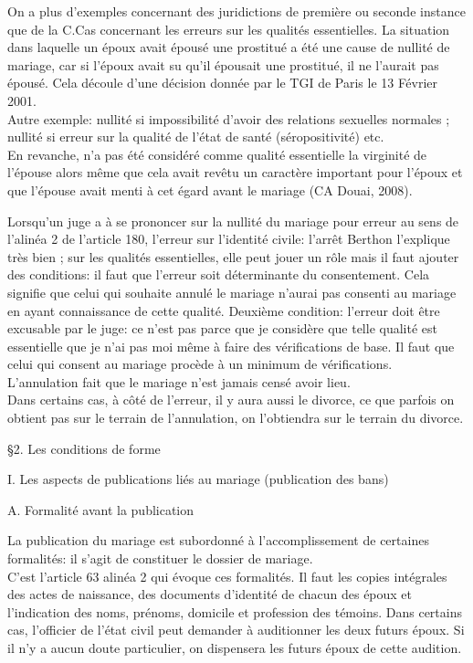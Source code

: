 \documentclass[12pt, a4paper, openany]{book}
\begin{document}
On a plus d'exemples concernant des juridictions de première ou seconde instance que de la C.Cas concernant les erreurs sur les qualités essentielles. La situation dans laquelle un époux avait épousé une prostitué a été une cause de nullité de mariage, car si l'époux avait su qu'il épousait une prostitué, il ne l'aurait pas épousé. Cela découle d'une décision donnée par le TGI de Paris le 13 Février 2001. \\
Autre exemple: nullité si impossibilité d'avoir des relations sexuelles normales ; nullité si erreur sur la qualité de l'état de santé (séropositivité) etc. \\
En revanche, n'a pas été considéré comme qualité essentielle la virginité de l'épouse alors même que cela avait revêtu un caractère important pour l'époux et que l'épouse avait menti à cet égard avant le mariage (CA Douai, 2008).


Lorsqu'un juge a à se prononcer sur la nullité du mariage pour erreur au sens de l'alinéa 2 de l'article 180, l'erreur sur l'identité civile: l'arrêt Berthon l'explique très bien ; sur les qualités essentielles, elle peut jouer un rôle mais il faut ajouter des conditions: il faut que l'erreur soit déterminante du consentement. Cela signifie que celui qui souhaite annulé le mariage n'aurai pas consenti au mariage en ayant connaissance de cette qualité. Deuxième condition: l'erreur doit être excusable par le juge: ce n'est pas parce que je considère que telle qualité est essentielle que je n'ai pas moi même à faire des vérifications de base. Il faut que celui qui consent au mariage procède à un minimum de vérifications. \\
L'annulation fait que le mariage n'est jamais censé avoir lieu. \\
Dans certains cas, à côté de l'erreur, il y aura aussi le divorce, ce que parfois on obtient pas sur le terrain de l'annulation, on l'obtiendra sur le terrain du divorce. 


§2. Les conditions de forme


I. Les aspects de publications liés au mariage (publication des bans)


A. Formalité avant la publication


La publication du mariage est subordonné à l'accomplissement de certaines formalités: il s'agit de constituer le dossier de mariage. \\
C'est l'article 63 alinéa 2 qui évoque ces formalités. Il faut les copies intégrales des actes de naissance, des documents d'identité de chacun des époux et l'indication des noms, prénoms, domicile et profession des témoins. Dans certains cas, l'officier de l'état civil peut demander à auditionner les deux futurs époux. Si il n'y a aucun doute particulier, on dispensera les futurs époux de cette audition. 
\end{document}
